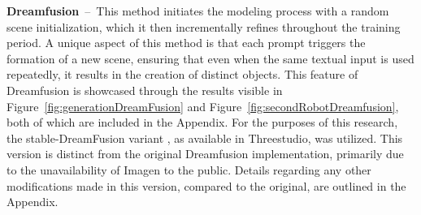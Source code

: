\textbf{Dreamfusion}~--~This method initiates the modeling process with a random scene initialization, which it then incrementally refines throughout the training period. A unique aspect of this method is that each prompt triggers the formation of a new scene, ensuring that even when the same textual input is used repeatedly, it results in the creation of distinct objects. This feature of Dreamfusion is showcased through the results visible in Figure~\ref{fig:generationDreamFusion} and Figure~\ref{fig:secondRobotDreamfusion}, both of which are included in the Appendix.
For the purposes of this research, the stable-DreamFusion variant \citep{stable-dreamfusion}, as available in Threestudio, was utilized. This version is distinct from the original Dreamfusion implementation, primarily due to the unavailability of Imagen to the public. Details regarding any other modifications made in this version, compared to the original, are outlined in the Appendix. 

